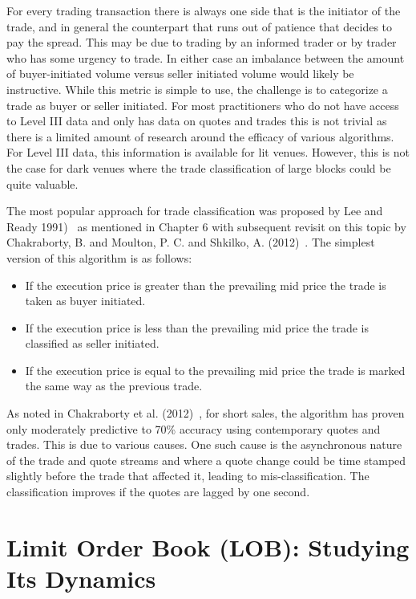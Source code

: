 For every trading transaction there is always one side that is the initiator of the trade, and in general the counterpart that runs out of patience that decides to pay the spread. This may be due to trading by an informed trader or by trader who has some urgency to trade. In either case an imbalance between the amount of buyer-initiated volume versus seller initiated volume would likely be instructive. While this metric is simple to use, the challenge is to categorize a trade as buyer or seller initiated. For most practitioners who do not have access to Level III data and only has data on quotes and trades this is not trivial as there is a limited amount of research around the efficacy of various algorithms. For Level III data, this information is available for lit venues. However, this is not the case for dark venues where the trade classification of large blocks could be quite valuable.


The most popular approach for trade classification was proposed by Lee and Ready 1991)~\cite{leeready} as mentioned in Chapter 6 with subsequent revisit on this topic by Chakraborty, B. and Moulton, P. C. and Shkilko, A. (2012)~\cite{chakrabarty2012short}. The simplest version of this algorithm is as follows:
        \begin{itemize}
        \item If the execution price is greater than the prevailing mid price the trade is taken as buyer initiated.
        \item If the execution price is less than the prevailing mid price the trade is classified as seller initiated.
        \item If the execution price is equal to the prevailing mid price the trade is marked the same way as the previous trade.
        \end{itemize}
As noted in Chakraborty et al. (2012)~\cite{chakrabarty2012short}, for short sales, the algorithm has proven only moderately predictive to 70\% accuracy using contemporary quotes and trades. This is due to various causes. One such cause is the asynchronous nature of the trade and quote streams and where a quote change could be time stamped slightly before the trade that affected it, leading to mis-classification. The classification improves if the quotes are lagged by one second.



\section{Limit Order Book (LOB): Studying Its Dynamics}


